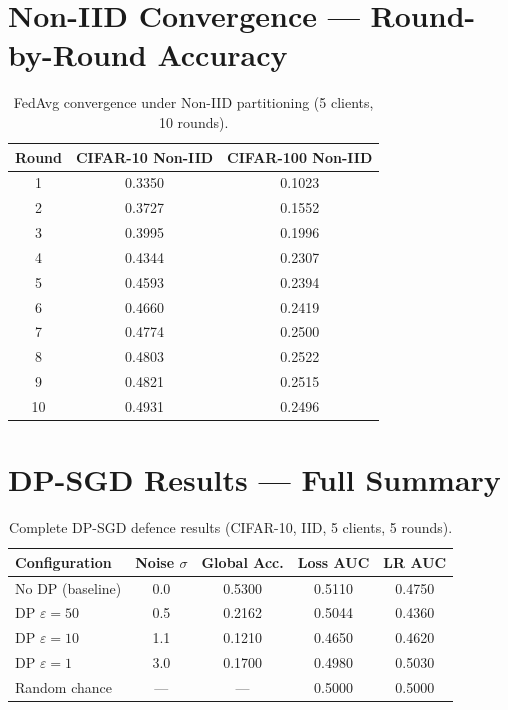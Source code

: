 \documentclass[12pt, a4paper]{report}
\begin{document}
\section{Non-IID Convergence --- Round-by-Round Accuracy}
\begin{table}[H]
  \centering
  \caption{FedAvg convergence under Non-IID partitioning (5 clients, 10 rounds).}
  \begin{tabular}{ccc}
    \toprule
    \textbf{Round} & \textbf{CIFAR-10 Non-IID} & \textbf{CIFAR-100 Non-IID} \\
    \midrule
    1  & 0.3350 & 0.1023 \\
    2  & 0.3727 & 0.1552 \\
    3  & 0.3995 & 0.1996 \\
    4  & 0.4344 & 0.2307 \\
    5  & 0.4593 & 0.2394 \\
    6  & 0.4660 & 0.2419 \\
    7  & 0.4774 & 0.2500 \\
    8  & 0.4803 & 0.2522 \\
    9  & 0.4821 & 0.2515 \\
    10 & 0.4931 & 0.2496 \\
    \bottomrule
  \end{tabular}
\end{table}

\section{DP-SGD Results --- Full Summary}
\begin{table}[H]
  \centering
  \caption{Complete DP-SGD defence results (CIFAR-10, IID, 5 clients, 5 rounds).}
  \begin{tabular}{lcccc}
    \toprule
    \textbf{Configuration} & \textbf{Noise $\sigma$} & \textbf{Global Acc.} & \textbf{Loss AUC} & \textbf{LR AUC} \\
    \midrule
    No DP (baseline) & 0.0 & 0.5300 & 0.5110 & 0.4750 \\
    DP $\varepsilon=50$ & 0.5 & 0.2162 & 0.5044 & 0.4360 \\
    DP $\varepsilon=10$ & 1.1 & 0.1210 & 0.4650 & 0.4620 \\
    DP $\varepsilon=1$  & 3.0 & 0.1700 & 0.4980 & 0.5030 \\
    \midrule
    Random chance & --- & --- & 0.5000 & 0.5000 \\
    \bottomrule
  \end{tabular}
\end{table}
\end{document}

